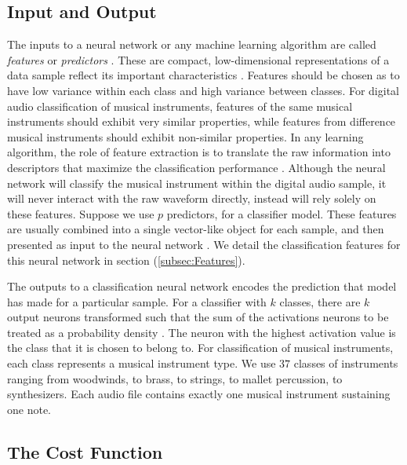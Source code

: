 \documentclass[conference,twocolumn,letterpaper]{IEEEtran}
\begin{document}
\subsection{Input and Output}
\label{subsec:InputOutput}

The inputs to a neural network or any machine learning algorithm are called \textit{features} or \textit{predictors} \cite{James}. These are compact, low-dimensional representations of a data sample reflect its important characteristics \cite{Liu}. Features should be chosen as to have low variance within each class and high variance between classes. For digital audio classification of musical instruments, features of the same musical instruments should exhibit very similar properties, while features from difference musical instruments should exhibit non-similar properties. In any learning algorithm, the role of feature extraction is to translate the raw information into descriptors that maximize the classification performance \cite{Virtanen}. Although the neural network will classify the musical instrument within the digital audio sample, it will never interact with the raw waveform directly, instead will rely solely on these features. Suppose we use $p$ predictors, for a classifier model. These features are usually combined into a single vector-like object for each sample, and then presented as input to the neural network \cite{Geron}. We detail the classification features for this neural network in section (\ref{subsec:Features}). 

The outputs to a classification neural network encodes the prediction that model has made for a particular sample. For a classifier with $k$ classes, there are $k$ output neurons transformed such that the sum of the activations 
neurons to be treated as a probability density \cite{Goodfellow,James}.  The neuron with the highest activation value is the class that it is chosen to belong to. For classification of musical instruments, each class represents a musical instrument type. We use $37$ classes of instruments ranging from woodwinds, to brass, to strings, to mallet percussion, to synthesizers. Each audio file contains exactly one musical instrument sustaining one note.


\subsection{The Cost Function}
\label{subsec:CostFunction}
\end{document}
